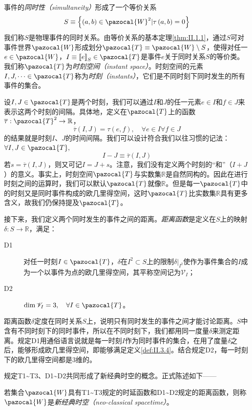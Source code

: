 \documentclass[main.tex]{subfiles}
\begin{document}
事件的\emph{同时性（simultaneity）}形成了一个等价关系
\[S\equiv\left\{\left(a,b\right)\in\pazocal{W}^2|\tau\left(a,b\right)=0\right\}\]
我们称$S$是物理事件的同时关系。由等价关系的基本定理\ref{thm:II.1.1}，通过$S$可对事件世界$\pazocal{W}$形成划分$\pazocal{T}\equiv\pazocal{W}\setminus S$，使得对任一$e\in\pazocal{W}$，$I\equiv\left\llbracket e\right\rrbracket_S\in\pazocal{T}$是事件$e$关于同时关系$S$的等价类。我们称$\pazocal{T}$为\emph{时刻空间（instant space）}。时刻空间的元素$I,J,\cdots\in\pazocal{T}$称为\emph{时刻（instants）}，它们是不同时刻下同时发生的所有事件的集合。

设$I,J\in\pazocal{T}$是两个时刻，我们可以通过$I$和$J$的任一元素$e\in I$和$f\in J$来表示这两个时刻的间隔。具体地，定义在$\pazocal{T}$上的函数$\overline{\tau}:\pazocal{T}^2\rightarrow\mathbb{R}$，
\[\overline{\tau}\left(I,J\right)=\tau\left(e,f\right),\quad\forall e\in I\forall f\in J\]
的结果就是时刻$I$、$J$的时间间隔。我们可以设计符合我们以往习惯的记法：$\forall I,J\in\pazocal{T},$
\[I-J\equiv\overline{\tau}\left(I,J\right)\]
若$s=\overline{\tau}\left(I,J\right)$，则又可记$I=J+s$。注意，我们没有定义两个时刻的“和”（$I+J$）的意义。事实上，时刻空间$\pazocal{T}$与实数集$\mathbb{R}$是自然同构的。因此在进行时刻之间的运算时，我们可以默认$\pazocal{T}$就像$\mathbb{R}$。但是每一$\pazocal{T}$中的时刻又是同时事件构成的欧几里得空间，这时$\pazocal{T}$比实数集$\mathbb{R}$具有更多含义，故我们仍保持提及$\pazocal{T}$。

接下来，我们定义两个同时发生的事件之间的距离。\emph{距离函数}是定义在$S$上的映射$\delta:S\rightarrow\mathbb{R}$，满足：
\begin{description}
    \item[D1] 对任一时刻$I\in\pazocal{T}$，$\delta$在$I^2\subset S$上的限制$\left.\delta\right|_{I^2}$使作为事件集合的$I$成为一个以事件为点的欧几里得空间，其平称空间记为$\mathcal{V}_I$；
    \item[D2] $\dim\mathcal{V}_I=3,\quad\forall I\in\pazocal{T}$。
\end{description}

距离函数$\delta$定度在同时关系$S$上，说明只有同时发生的事件之间才能讨论距离。$S$中含有不同时刻下的同时事件，所以在不同时刻下，我们都用同一度量$\delta$来测定距离。规定D1用通俗语言说就是每一时刻$I$作为同时事件的集合，在用了度量$\delta$之后，能够形成欧几里得空间，即能够满足定义\ref{def:II.3.4}。结合规定D2，每一时刻下的欧几里得空间都是3维的。

规定T1\textasciitilde T3、D1\textasciitilde D2共同形成了新经典时空的概念。正式陈述如下——

\begin{definition}[新经典时空]\label{def:III.5.1}
    若集合$\pazocal{W}$具有T1\textasciitilde T3规定的时延函数和D1\textasciitilde D2规定的距离函数，则称$\pazocal{W}$是\emph{新经典时空（neo-classical spacetime）}。
\end{definition}
\end{document}
